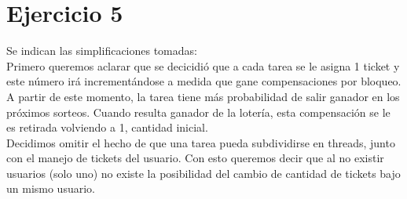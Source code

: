 \section{Ejercicio 5}
Se indican las simplificaciones tomadas:\\
Primero queremos aclarar que se decicidió que a cada tarea se le asigna 1 ticket y este número irá 
incrementándose a medida que gane compensaciones por bloqueo. A partir de este momento, la tarea tiene más probabilidad de salir ganador en los próximos sorteos. Cuando resulta ganador de la lotería, esta compensación se le es retirada volviendo a 1, cantidad inicial.\\
Decidimos omitir el hecho de que una tarea pueda subdividirse en threads, junto con el manejo
de tickets del usuario. Con esto queremos decir que al no existir usuarios (solo uno) no existe la posibilidad del cambio
de cantidad de tickets bajo un mismo usuario.

